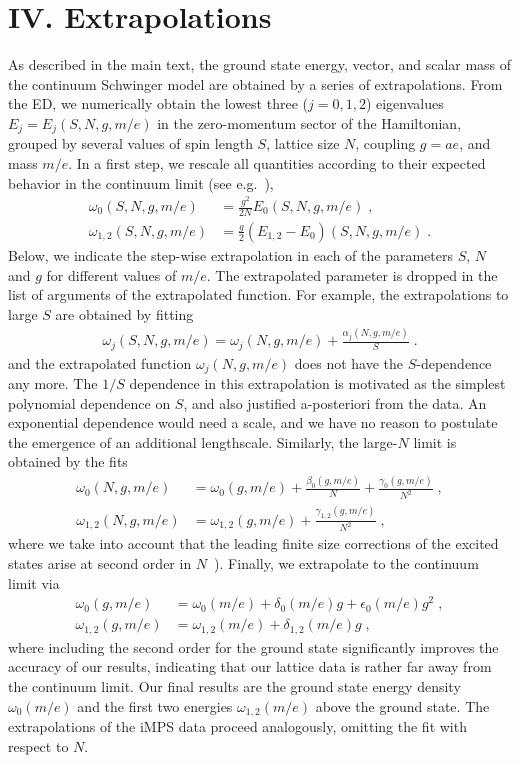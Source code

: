 \documentclass[aps,prl,reprint,twocolumn,superscriptaddress,floatfix,nofootinbib]{revtex4-1}
\begin{document}
\section{IV. Extrapolations}
As described in the main text, the ground state energy, vector, and scalar mass of the continuum Schwinger model are obtained by a series of extrapolations.
From the ED, we numerically obtain the lowest three ($j=0,1,2$) eigenvalues $E_{j} = E_{j}(S,N,g,m/e)$ in the zero-momentum sector of the Hamiltonian, grouped by several values of spin length $S$, lattice size $N$, coupling $g=ae$, and mass $m/e$. In a first step, we rescale all quantities according to their expected behavior in the continuum limit (see e.g.~\cite{banuls2013mass}),
\begin{align}
	\omega_0(S,N,g,m/e) &= \frac{g^2}{2N}E_0(S,N,g,m/e) \;, \\ \omega_{1,2}(S,N,g,m/e) &= \frac{g}{2}(E_{1,2}-E_0)(S,N,g,m/e) \;.
\end{align}
Below, we indicate the step-wise extrapolation in each of the parameters $S$, $N$ and $g$ for different values of $m/e$. The extrapolated parameter is dropped in the list of arguments of the extrapolated function. For example, the extrapolations to large $S$ are obtained by fitting
\begin{align} \label{eq:fit1}
	\omega_j(S,N,g,m/e) = \omega_j(N,g,m/e) + \frac{\alpha_j(N,g,m/e)}{S} \;.
\end{align}
and the extrapolated function $\omega_j (N,g,m/e)$ does not have the $S$-dependence any more. The $1/S$ dependence in this extrapolation is motivated as the simplest polynomial dependence on $S$, and also justified a-posteriori from the data. An exponential dependence would need a scale, and we have no reason to postulate the emergence of an additional lengthscale. Similarly, the large-$N$ limit is obtained by the fits
\begin{align}  \label{eq:fit2a}
	\omega_0(N,g,m/e) &= \omega_0(g,m/e)  + \frac{\beta_0(g,m/e)}{N} + \frac{\gamma_0(g,m/e)}{N^2} \;, \\  \label{eq:fit2b}
	\omega_{1,2}(N,g,m/e) &= \omega_{1,2}(g,m/e)  +  \frac{\gamma_{1,2}(g,m/e)}{N^2} \;,
\end{align}
where we take into account that the leading finite size corrections of the excited states arise at second order in $N$~\cite{banuls2013mass}). Finally, we extrapolate to the continuum limit via
\begin{align}  \label{eq:fit3a}
	\omega_0(g,m/e) &= \omega_0(m/e)  + \delta_0(m/e) g + \epsilon_0(m/e) g^2\;,\\  \label{eq:fit3b}
	\omega_{1,2}(g,m/e) &= \omega_{1,2}(m/e)  + \delta_{1,2}(m/e) g \;,
\end{align}
where including the second order for the ground state significantly improves the accuracy of our results, indicating that our lattice data is rather far away from the continuum limit. Our final results are the ground state energy density $\omega_0(m/e)$ and the first two energies $\omega_{1,2}(m/e)$ above the ground state.
The extrapolations of the iMPS data proceed analogously, omitting the fit with respect to $N$.
\end{document}
